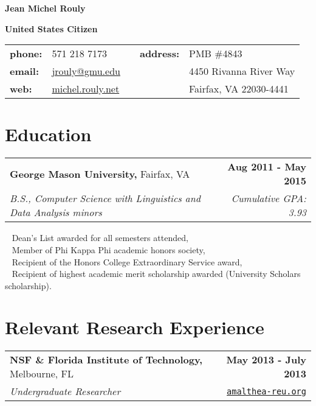 \documentclass[letterpaper]{article}
\newcommand{\detail}{\indent\textbullet ~ }
\begin{document}
  \setcounter{secnumdepth}{0}

  {
    \huge
    \noindent
    \textbf{Jean Michel Rouly}
  }

  \noindent\textbf{United States Citizen} \\

  \noindent\begin{tabularx}{\textwidth}{@{}l l X l l@{}}
    \textbf{phone:}  & 571 218 7173                                  & & \textbf{address:} &  PMB \#4843 \\
    \textbf{email:}  & \href{mailto:jrouly@gmu.edu}{jrouly@gmu.edu}  & &                   &  4450 Rivanna River Way \\
    \textbf{web:}    & \href{michel.rouly.net}{michel.rouly.net}     & &                   &  Fairfax, VA 22030-4441
  \end{tabularx}

  \section{Education}
  \noindent
  \begin{tabularx}{\textwidth}{@{}X r@{}}
    \textbf{George Mason University,} Fairfax, VA & \textbf{Aug 2011 - May 2015} \\
    \emph{B.S., Computer Science with Linguistics and Data Analysis minors} & \emph{Cumulative GPA: 3.93} \\[0.2cm]
  \end{tabularx}

  \detail Dean's List awarded for all semesters attended,\\
  \detail Member of Phi Kappa Phi academic honors society,\\
  \detail Recipient of the Honors College Extraordinary Service award,\\
  \detail Recipient of highest academic merit scholarship awarded (University Scholars scholarship).


  \section{Relevant Research Experience}

  \noindent
  \begin{tabularx}{\textwidth}{@{}X r@{}}
    \textbf{NSF \& Florida Institute of Technology,} Melbourne, FL & \textbf{May 2013 - July 2013} \\
    \emph{Undergraduate Researcher} & \texttt{\href{amalthea-reu.org}{amalthea-reu.org}}
  \end{tabularx}
\end{document}
